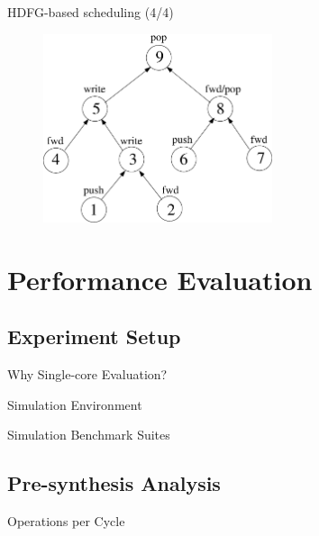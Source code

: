 \documentclass{beamer}
\begin{document}
\begin{CJK}{UTF8}{bkai}
    \begin{frame}{HDFG-based scheduling (4/4)}
        \begin{figure}[!h]
            \begin{center}
                \includegraphics[width=0.6\textwidth]{figs/hfpt.eps}
            \end{center}
            \label{fig:hfpt}
        \end{figure}%
    \end{frame}
        
    \section{Performance Evaluation}
    \subsection{Experiment Setup}
    \begin{frame}{Why Single-core Evaluation?}
        
    \end{frame}
    \begin{frame}{Simulation Environment}
        
    \end{frame}

    \begin{frame}{Simulation Benchmark Suites}
        
    \end{frame}

    \subsection{Pre-synthesis Analysis}

    \begin{frame}{Operations per Cycle}
        

\end{frame}
\end{CJK}
\end{document}
